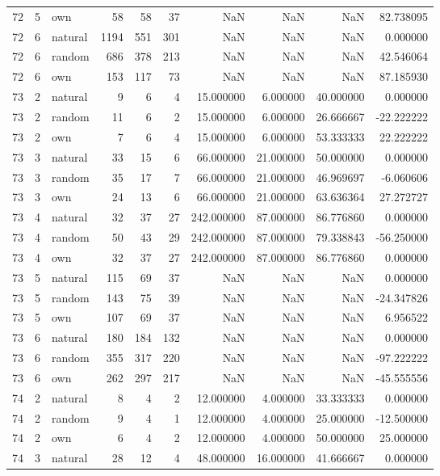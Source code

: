 \begin{table}[htbp]
\begin{tabular}{rrlrrrrrrr}
72 & 5 & own & 58 & 58 & 37 & NaN & NaN & NaN & 82.738095 \\
72 & 6 & natural & 1194 & 551 & 301 & NaN & NaN & NaN & 0.000000 \\
72 & 6 & random & 686 & 378 & 213 & NaN & NaN & NaN & 42.546064 \\
72 & 6 & own & 153 & 117 & 73 & NaN & NaN & NaN & 87.185930 \\
73 & 2 & natural & 9 & 6 & 4 & 15.000000 & 6.000000 & 40.000000 & 0.000000 \\
73 & 2 & random & 11 & 6 & 2 & 15.000000 & 6.000000 & 26.666667 & -22.222222 \\
73 & 2 & own & 7 & 6 & 4 & 15.000000 & 6.000000 & 53.333333 & 22.222222 \\
73 & 3 & natural & 33 & 15 & 6 & 66.000000 & 21.000000 & 50.000000 & 0.000000 \\
73 & 3 & random & 35 & 17 & 7 & 66.000000 & 21.000000 & 46.969697 & -6.060606 \\
73 & 3 & own & 24 & 13 & 6 & 66.000000 & 21.000000 & 63.636364 & 27.272727 \\
73 & 4 & natural & 32 & 37 & 27 & 242.000000 & 87.000000 & 86.776860 & 0.000000 \\
73 & 4 & random & 50 & 43 & 29 & 242.000000 & 87.000000 & 79.338843 & -56.250000 \\
73 & 4 & own & 32 & 37 & 27 & 242.000000 & 87.000000 & 86.776860 & 0.000000 \\
73 & 5 & natural & 115 & 69 & 37 & NaN & NaN & NaN & 0.000000 \\
73 & 5 & random & 143 & 75 & 39 & NaN & NaN & NaN & -24.347826 \\
73 & 5 & own & 107 & 69 & 37 & NaN & NaN & NaN & 6.956522 \\
73 & 6 & natural & 180 & 184 & 132 & NaN & NaN & NaN & 0.000000 \\
73 & 6 & random & 355 & 317 & 220 & NaN & NaN & NaN & -97.222222 \\
73 & 6 & own & 262 & 297 & 217 & NaN & NaN & NaN & -45.555556 \\
74 & 2 & natural & 8 & 4 & 2 & 12.000000 & 4.000000 & 33.333333 & 0.000000 \\
74 & 2 & random & 9 & 4 & 1 & 12.000000 & 4.000000 & 25.000000 & -12.500000 \\
74 & 2 & own & 6 & 4 & 2 & 12.000000 & 4.000000 & 50.000000 & 25.000000 \\
74 & 3 & natural & 28 & 12 & 4 & 48.000000 & 16.000000 & 41.666667 & 0.000000 \\

\end{tabular}
\end{table}
